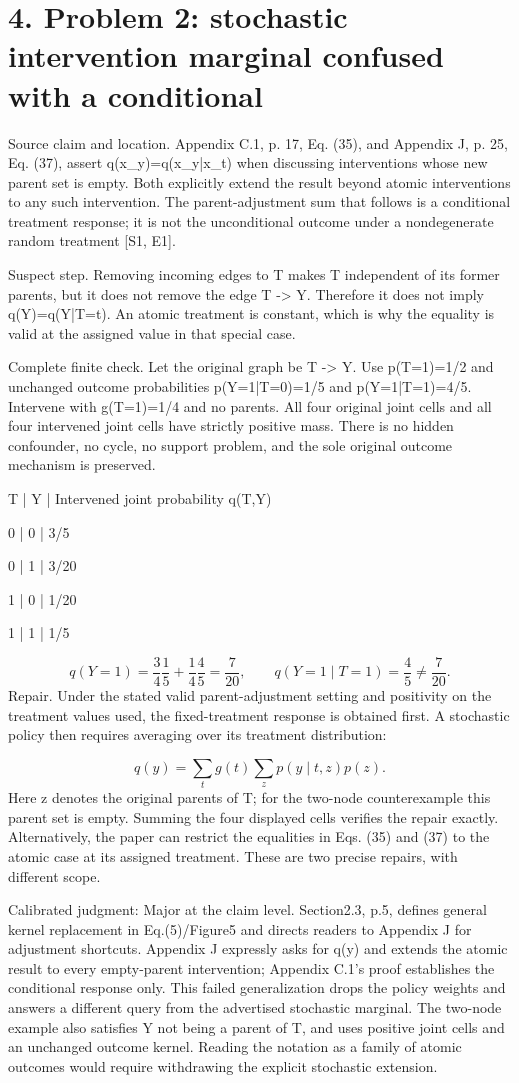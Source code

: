\documentclass[10pt]{article}
\begin{document}
\section*{4. Problem 2: stochastic intervention marginal confused with a conditional}
Source claim and location. Appendix C.1, p. 17, Eq. (35), and Appendix J, p. 25, Eq. (37), assert q(x\_y)=q(x\_y|x\_t) when discussing interventions whose new parent set is empty. Both explicitly extend the result beyond atomic interventions to any such intervention. The parent-adjustment sum that follows is a conditional treatment response; it is not the unconditional outcome under a nondegenerate random treatment [S1, E1].\par
Suspect step. Removing incoming edges to T makes T independent of its former parents, but it does not remove the edge T -> Y. Therefore it does not imply q(Y)=q(Y|T=t). An atomic treatment is constant, which is why the equality is valid at the assigned value in that special case.\par
Complete finite check. Let the original graph be T -> Y. Use p(T=1)=1/2 and unchanged outcome probabilities p(Y=1|T=0)=1/5 and p(Y=1|T=1)=4/5. Intervene with g(T=1)=1/4 and no parents. All four original joint cells and all four intervened joint cells have strictly positive mass. There is no hidden confounder, no cycle, no support problem, and the sole original outcome mechanism is preserved.\par
T | Y | Intervened joint probability q(T,Y)\par
0 | 0 | 3/5\par
0 | 1 | 3/20\par
1 | 0 | 1/20\par
1 | 1 | 1/5\par
\[q(Y=1)=\frac34\frac15+\frac14\frac45=\frac7{20},\qquad q(Y=1\mid T=1)=\frac45\ne\frac7{20}.\] Repair. Under the stated valid parent-adjustment setting and positivity on the treatment values used, the fixed-treatment response is obtained first. A stochastic policy then requires averaging over its treatment distribution:\par
\[q(y)=\sum_t g(t)\sum_z p(y\mid t,z)p(z).\] Here z denotes the original parents of T; for the two-node counterexample this parent set is empty. Summing the four displayed cells verifies the repair exactly. Alternatively, the paper can restrict the equalities in Eqs. (35) and (37) to the atomic case at its assigned treatment. These are two precise repairs, with different scope.\par
Calibrated judgment: Major at the claim level. Section2.3, p.5, defines general kernel replacement in Eq.(5)/Figure5 and directs readers to Appendix J for adjustment shortcuts. Appendix J expressly asks for q(y) and extends the atomic result to every empty-parent intervention; Appendix C.1’s proof establishes the conditional response only. This failed generalization drops the policy weights and answers a different query from the advertised stochastic marginal. The two-node example also satisfies Y not being a parent of T, and uses positive joint cells and an unchanged outcome kernel. Reading the notation as a family of atomic outcomes would require withdrawing the explicit stochastic extension.\par
\end{document}
